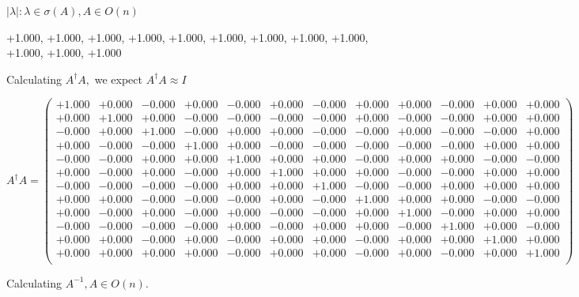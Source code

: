 \documentclass[9pt]{article}
\theoremstyle{plain}
\theoremstyle{definition}
\theoremstyle{remark}
\numberwithin{equation}{section}
\begin{document}
 $|\lambda | : \lambda \in \sigma(A) , A \in O(n)$

+1.000, +1.000, +1.000, +1.000, +1.000, +1.000, +1.000, +1.000, +1.000, +1.000, +1.000, +1.000


Calculating $A^{\dag} A,$  we expect $A^{\dag} A \approx I$

$A^{\dag} A = \left(
\begin{array}{
cccccccccccc}
+1.000 & +0.000 & -0.000 & +0.000 & -0.000 & +0.000 & -0.000 & +0.000 & +0.000 & -0.000 & +0.000 & +0.000 \\
+0.000 & +1.000 & +0.000 & -0.000 & -0.000 & -0.000 & -0.000 & +0.000 & -0.000 & -0.000 & +0.000 & +0.000 \\
-0.000 & +0.000 & +1.000 & -0.000 & +0.000 & +0.000 & -0.000 & -0.000 & +0.000 & -0.000 & -0.000 & +0.000 \\
+0.000 & -0.000 & -0.000 & +1.000 & +0.000 & -0.000 & -0.000 & -0.000 & -0.000 & -0.000 & +0.000 & +0.000 \\
-0.000 & -0.000 & +0.000 & +0.000 & +1.000 & +0.000 & +0.000 & -0.000 & +0.000 & +0.000 & -0.000 & -0.000 \\
+0.000 & -0.000 & +0.000 & -0.000 & +0.000 & +1.000 & +0.000 & +0.000 & -0.000 & -0.000 & +0.000 & +0.000 \\
-0.000 & -0.000 & -0.000 & -0.000 & +0.000 & +0.000 & +1.000 & -0.000 & -0.000 & +0.000 & +0.000 & +0.000 \\
+0.000 & +0.000 & -0.000 & -0.000 & -0.000 & +0.000 & -0.000 & +1.000 & +0.000 & +0.000 & -0.000 & -0.000 \\
+0.000 & -0.000 & +0.000 & -0.000 & +0.000 & -0.000 & -0.000 & +0.000 & +1.000 & -0.000 & +0.000 & +0.000 \\
-0.000 & -0.000 & -0.000 & -0.000 & +0.000 & -0.000 & +0.000 & +0.000 & -0.000 & +1.000 & +0.000 & -0.000 \\
+0.000 & +0.000 & -0.000 & +0.000 & -0.000 & +0.000 & +0.000 & -0.000 & +0.000 & +0.000 & +1.000 & +0.000 \\
+0.000 & +0.000 & +0.000 & +0.000 & -0.000 & +0.000 & +0.000 & -0.000 & +0.000 & -0.000 & +0.000 & +1.000 \\
\end{array}
\right)$ \newline 

Calculating $A^{-1} ,  A \in O(n)$.
\end{document}
